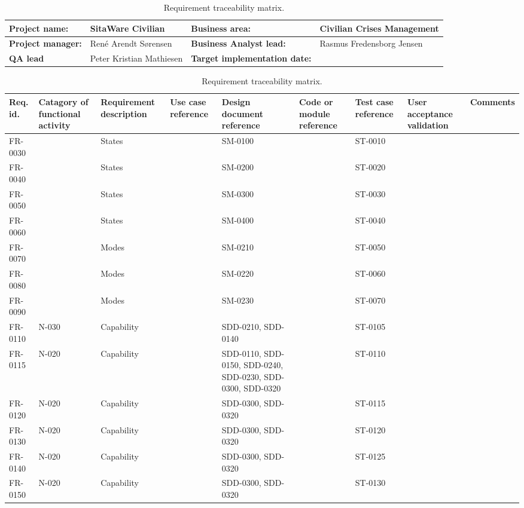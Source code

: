 \begin{sidewaystable}
\begin{table}[H]
\begin{tabular}{|l|l|l|l|}
\hline
 \textbf{Project name:} & SitaWare Civilian & \textbf{Business area:}  & Civilian Crises Management\\ \hline
 \textbf{Project manager:} & René Arendt Sørensen & \textbf{Business Analyst lead:} & Rasmus Fredensborg Jensen\\ \hline
 \textbf{QA lead} & Peter Kristian Mathiesen & \textbf{Target implementation date:}  & \\ \hline
\end{tabular}	
\begin{tabular}{|p{2cm}|p{2cm}|p{3cm}|p{2cm}|p{2cm}|p{2cm}|p{2cm}|p{2cm}|p{2cm}|}
\hline
 Req. id. & Catagory of functional activity & Requirement description  & Use case reference & Design document reference & Code or module reference & Test case reference & User acceptance validation & Comments\\ \hline
 FR-0030 & & States & &SM-0100  & & ST-0010 & &\\ \hline 
FR-0040 & & States & &SM-0200 & & ST-0020& &\\ \hline  
FR-0050 & & States & &SM-0300 & & ST-0030 & &\\ \hline  
FR-0060 & & States & &SM-0400 & & ST-0040& &\\ \hline  
FR-0070 & & Modes & &SM-0210 & & ST-0050& &\\ \hline  
FR-0080 & & Modes & &SM-0220 & & ST-0060& &\\ \hline 
FR-0090 & & Modes & &SM-0230 & & ST-0070& &\\ \hline 
 FR-0110 & N-030 & Capability & &SDD-0210, SDD-0140 & & ST-0105& &\\ \hline
 FR-0115 & N-020 & Capability & &SDD-0110, SDD-0150, SDD-0240, SDD-0230, SDD-0300, SDD-0320& & ST-0110& &\\ \hline
 FR-0120 & N-020 & Capability & &SDD-0300, SDD-0320 & & ST-0115& &\\ \hline
 FR-0130 & N-020 & Capability & &SDD-0300, SDD-0320 & & ST-0120& &\\ \hline
 FR-0140 & N-020 & Capability & &SDD-0300, SDD-0320 & & ST-0125& &\\ \hline
 FR-0150 & N-020 & Capability & &SDD-0300, SDD-0320& & ST-0130& &\\ \hline
\end{tabular}	
\caption{Requirement traceability matrix.}
\end{table}

\end{sidewaystable}


